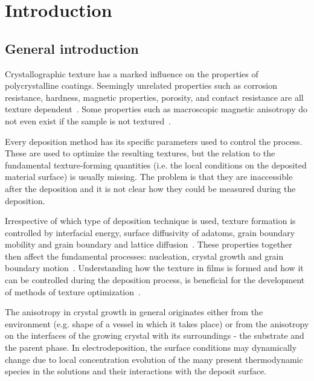 \chapter{Introduction} \label{ch_introduction}




\section{General introduction}
Crystallographic texture has a marked influence on the properties of polycrystalline coatings. Seemingly unrelated properties such as corrosion resistance, hardness, magnetic properties, porosity, and contact resistance are all texture dependent~\cite{Schlesinger2010}. Some properties such as macroscopic magnetic anisotropy do not even exist if the sample is not textured~\cite{Dinnebier2008}.

Every deposition method has its specific parameters used to control the process. These are used to optimize the resulting textures, but the relation to the fundamental texture-forming quantities (i.e. the local conditions on the deposited material surface) is usually missing. The problem is that they are inaccessible after the deposition and it is not clear how they could be measured during the deposition. 

Irrespective of which type of deposition technique is used, texture formation is controlled by interfacial energy, surface diffusivity of adatoms, grain boundary mobility and grain boundary and lattice diffusion~\cite{Szpunar1997, Suwas2014}. These properties together then affect the fundamental processes: nucleation, crystal growth and grain boundary motion~\cite{Barna1998}. Understanding how the texture in films is formed and how it can be controlled during the deposition process, is beneficial for the development of methods of texture optimization~\cite{Szpunar1997}. 

The anisotropy in crystal growth in general originates either from the environment (e.g. shape of a vessel in which it takes place) or from the anisotropy on the interfaces of the growing crystal with its surroundings - the substrate and the parent phase. In electrodeposition, the surface conditions may dynamically change due to local concentration evolution of the many present thermodynamic species in the solutions and their interactions with the deposit surface. 

